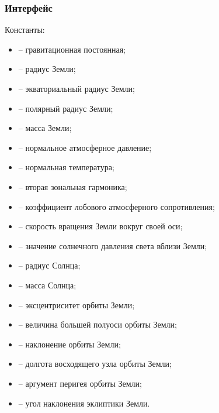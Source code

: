 \subsubsection{Интерфейс }
\noindent\indent Константы:
\begin{itemize}
    \item {} -- гравитационная постоянная;
    \item {} -- радиус Земли;
    \item {} -- экваториальный радиус Земли;
    \item {} -- полярный радиус Земли;
    \item {} -- масса Земли;
    \item {} -- нормальное атмосферное давление;
    \item {} -- нормальная температура;
    \item {} -- вторая зональная гармоника;
    \item {} -- коэффициент лобового атмосферного сопротивления;
    \item {} -- скорость вращения Земли вокруг своей оси;
    \item {} -- значение солнечного давления света вблизи Земли;
    \item {} -- радиус Солнца;
    \item {} -- масса Солнца;
    \item {} -- эксцентриситет орбиты Земли;
    \item {} -- величина большей полуоси орбиты Земли;
    \item {} -- наклонение орбиты Земли;
    \item {} -- долгота восходящего узла орбиты Земли;
    \item {} -- аргумент перигея орбиты Земли;
    \item {} -- угол наклонения эклиптики Земли.
\end{itemize}
